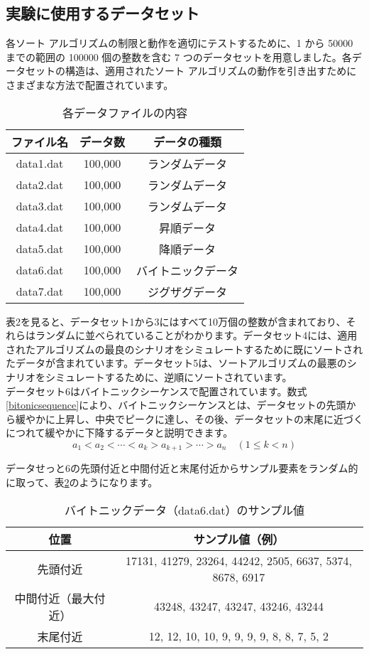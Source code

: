 \documentclass[a4j, 12pt]{jarticle}
\begin{document}
\subsection{実験に使用するデータセット}
各ソート アルゴリズムの制限と動作を適切にテストするために、1 から 50000 までの範囲の 100000 個の整数を含む 7 つのデータセットを用意しました。各データセットの構造は、適用されたソート アルゴリズムの動作を引き出すためにさまざまな方法で配置されています。
\begin{table}[htbp]
  \centering
  \caption{各データファイルの内容}
  \begin{tabular}{|c|c|c|}
    \hline
    ファイル名 & データ数 & データの種類 \\
    \hline
    data1.dat & 100,000 & ランダムデータ \\
    data2.dat & 100,000 & ランダムデータ \\
    data3.dat & 100,000 & ランダムデータ \\
    data4.dat & 100,000 & 昇順データ \\
    data5.dat & 100,000 & 降順データ \\
    data6.dat & 100,000 & バイトニックデータ \\
    data7.dat & 100,000 & ジグザグデータ \\
    \hline
  \end{tabular}\label{tab:dataset-summary}
\end{table}
表2を見ると、データセット1から3にはすべて10万個の整数が含まれており、それらはランダムに並べられていることがわかります。データセット4には、適用されたアルゴリズムの最良のシナリオをシミュレートするために既にソートされたデータが含まれています。データセット5は、ソートアルゴリズムの最悪のシナリオをシミュレートするために、逆順にソートされています。\\

データセット6はバイトニックシーケンスで配置されています。数式\ref{bitonicsequence}により、バイトニックシーケンスとは、データセットの先頭から緩やかに上昇し、中央でピークに達し、その後、データセットの末尾に近づくにつれて緩やかに下降するデータと説明できます。\\
\begin{equation}\label{bitonicsequence}
a_1 < a_2 < \cdots < a_k > a_{k+1} > \cdots > a_n
\quad (1 \leq k < n)
\end{equation}

データせっと6の先頭付近と中間付近と末尾付近からサンプル要素をランダム的に取って、表\ref{tab:data6-sample}のようになります。
\begin{table}[H]
  \centering
  \caption{バイトニックデータ（data6.dat）のサンプル値}
  \begin{tabular}{|c|c|}
    \hline
    位置 & サンプル値（例） \\
    \hline
    先頭付近 & 17131, 41279, 23264, 44242, 2505, 6637, 5374, 8678, 6917\\
    中間付近（最大付近） & 43248, 43247, 43247, 43246, 43244 \\
    末尾付近 & 12, 12, 10, 10, 9, 9, 9, 9, 8, 8, 7, 5, 2 \\
    \hline
  \end{tabular}\label{tab:data6-sample}
\end{table}
\end{document}

